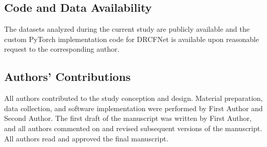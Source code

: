 \documentclass[sn-mathphys,Numbered]{sn-jnl}
\theoremstyle{thmstyleone}
\theoremstyle{thmstyletwo}
\theoremstyle{thmstylethree}
\begin{document}
\subsection*{Code and Data Availability}
The datasets analyzed during the current study are publicly available and the custom PyTorch implementation code for DRCFNet is available upon reasonable request to the corresponding author.

\subsection*{Authors' Contributions}
All authors contributed to the study conception and design. Material preparation, data collection, and software implementation were performed by First Author and Second Author. The first draft of the manuscript was written by First Author, and all authors commented on and revised subsequent versions of the manuscript. All authors read and approved the final manuscript.
\end{document}
